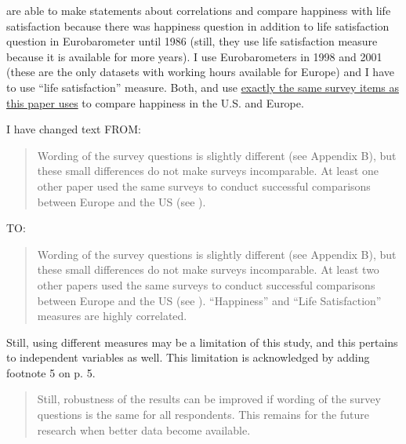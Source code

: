 \noindent \citet{alesina03} \citet{stevenson09w} are able to make statements about correlations and compare
happiness with life satisfaction because there was happiness question in addition to life
satisfaction question in Eurobarometer until 1986
(still, they use life satisfaction measure because it is available for more years).
I use Eurobarometers in 1998 and 2001 (these are the only datasets with working hours available
for Europe) and I have to use ``life satisfaction'' measure. Both, \citet{alesina03} and
\citet{stevenson09w} use \underline{exactly the same survey items as this paper uses} to compare
happiness in the U.S. and Europe.

 I have changed text FROM:

\begin{quote}
 Wording of the
survey questions is slightly
different (see  Appendix B), but these small
differences do not make surveys
incomparable. At least one other paper used the same surveys
to conduct successful comparisons
between Europe and the US (see \citet{alesina03}). 
\end{quote}

\noindent TO:

\begin{quote}
Wording of the
survey questions is slightly
different (see  Appendix B), but these small
differences do not make surveys
incomparable. At least two other papers used the same surveys
to conduct successful comparisons
between Europe and the US (see \citet{alesina03, stevenson09w}). ``Happiness'' and ``Life
Satisfaction'' measures are highly correlated. 
\end{quote}

\noindent Still, using different measures may be a limitation of this study, and this pertains to
independent variables as well. This limitation is acknowledged by adding  
footnote 5 on p. 5.

\begin{quote}
 Still, robustness of the results can be improved if wording of the survey
 questions is the same for all respondents. This remains for the future research when better data
 become available.
\end{quote}



